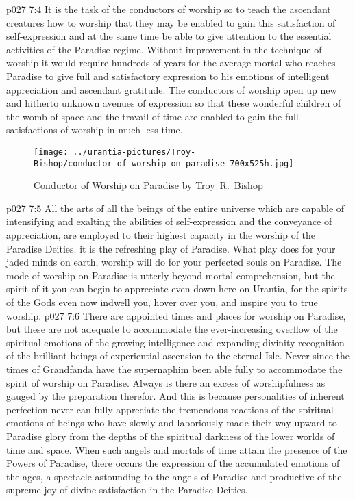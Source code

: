 \vs p027 7:4 \pc It is the task of the conductors of worship so to teach the ascendant creatures how to worship that they may be enabled to gain this satisfaction of self\hyp{}expression and at the same time be able to give attention to the essential activities of the Paradise regime. Without improvement in the technique of worship it would require hundreds of years for the average mortal who reaches Paradise to give full and satisfactory expression to his emotions of intelligent appreciation and ascendant gratitude. The conductors of worship open up new and hitherto unknown avenues of expression so that these wonderful children of the womb of space and the travail of time are enabled to gain the full satisfactions of worship in much less time.
\begin{figure}[H]
\centering
\texttt{[image: ../urantia-pictures/Troy-Bishop/conductor\_of\_worship\_on\_paradise\_700x525h.jpg]}
\caption{Conductor of Worship on Paradise by Troy~R.~Bishop}
\end{figure}
\vs p027 7:5 All the arts of all the beings of the entire universe which are capable of intensifying and exalting the abilities of self\hyp{}expression and the conveyance of appreciation, are employed to their highest capacity in the worship of the Paradise Deities.  it is the refreshing play of Paradise. What play does for your jaded minds on earth, worship will do for your perfected souls on Paradise. The mode of worship on Paradise is utterly beyond mortal comprehension, but the spirit of it you can begin to appreciate even down here on Urantia, for the spirits of the Gods even now indwell you, hover over you, and inspire you to true worship.
\vs p027 7:6 There are appointed times and places for worship on Paradise, but these are not adequate to accommodate the ever\hyp{}increasing overflow of the spiritual emotions of the growing intelligence and expanding divinity recognition of the brilliant beings of experiential ascension to the eternal Isle. Never since the times of Grandfanda have the supernaphim been able fully to accommodate the spirit of worship on Paradise. Always is there an excess of worshipfulness as gauged by the preparation therefor. And this is because personalities of inherent perfection never can fully appreciate the tremendous reactions of the spiritual emotions of beings who have slowly and laboriously made their way upward to Paradise glory from the depths of the spiritual darkness of the lower worlds of time and space. When such angels and mortals of time attain the presence of the Powers of Paradise, there occurs the expression of the accumulated emotions of the ages, a spectacle astounding to the angels of Paradise and productive of the supreme joy of divine satisfaction in the Paradise Deities.
